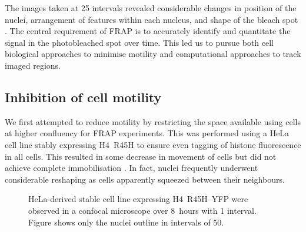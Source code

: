     The images taken at \SI{25}{\min} intervals revealed considerable changes
    in position of the nuclei, arrangement of features within each nucleus,
    and shape of the bleach spot .
    The central requirement of FRAP is to accurately identify and
    quantitate the signal in the photobleached spot over time.
    This led us to pursue both cell biological approaches to minimise motility
    and computational approaches to track imaged regions.

  \subsection{Inhibition of cell motility}

    We first attempted to reduce motility by restricting the space available
    using cells at higher confluency for FRAP experiments.
    This was performed using a HeLa cell line stably expressing
    H4~R45H to ensure even
    tagging of histone fluorescence in all cells.
    This resulted in some decrease in movement of cells
    but did not achieve complete immobilisation
    .
    In fact, nuclei frequently underwent considerable reshaping as cells
    apparently squeezed between their neighbours.

    \begin{figure}
      \centering
        {
          HeLa-derived stable cell line expressing H4~R45H--YFP
          were observed in a confocal microscope over 8~hours with
          \SI{1}{\min} interval.  Figure shows only the nuclei outline
          in intervals of \SI{50}{\min}.
        }
      \label{fig:kill-frap:confluent-hela}
    \end{figure}

